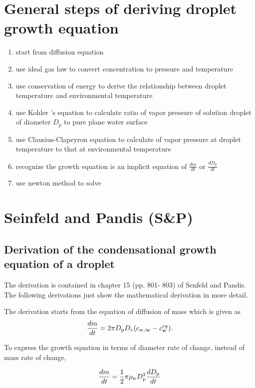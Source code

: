 \documentclass[12pt]{article}
\begin{document}
\section{General steps of deriving droplet growth equation}

\begin{enumerate}
\item start from diffusion equation 
\item use ideal gas law to convert concentration to pressure and temperature
\item use conservation of energy to derive the relationship between droplet temperature and environmental temperature
\item use Kohler 's equation to calculate ratio of vapor pressure of solution droplet of diameter $D_{p}$ to pure plane water surface 
\item use Clausius-Clapeyron equation to calculate of vapor pressure at droplet temperature to that at environmental temperature
\item recognize the growth equation is an implicit equation of $\frac{dm}{dt}$ or $\frac{dD_{p}}{dt}$
\item use newton method to solve
 
\end{enumerate}
 
\section{Seinfeld and Pandis (S\&P) }

\subsection{Derivation of the condensational growth equation of a droplet}


The derivation is contained in chapter 15 (pp. 801- 803) of Senfeld and Pandis. The following derivations just show the mathematical derivation in more detail.

The derivation starts from the equation of diffusion of mass which is given as
\begin{equation}\label{eqn:1}
\frac{dm}{dt}=2 \pi D_{\rm p} D_{\rm v} (c_{\rm w, \infty} - c_{\rm w}^{eq}).  
\end{equation}

To express the growth equation in terms of diameter rate of change, instead of mass rate of change,

\begin{equation}\label{eqn:2}
\frac{dm}{dt}=\frac{1}{2} \pi \rho_{\rm w} D_{\rm p}^{2} \frac{dD_{\rm p}}{dt}
\end{equation}
\end{document}
